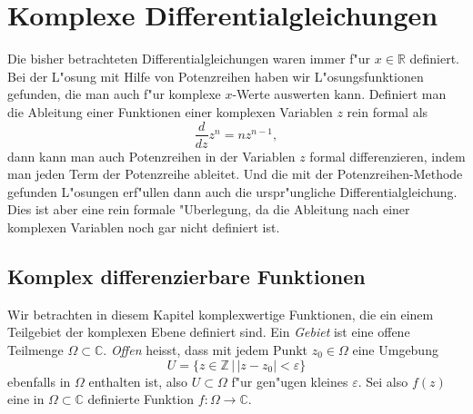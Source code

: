 %
%
%
\chapter{Komplexe Differentialgleichungen\label{chapter:komplexeanalysis}}
\lhead{}
Die bisher betrachteten Differentialgleichungen waren immer f"ur
$x\in\mathbb R$ definiert.
Bei der L"osung mit Hilfe von Potenzreihen haben wir L"osungsfunktionen
gefunden, die man auch f"ur komplexe $x$-Werte auswerten kann.
Definiert man die Ableitung einer Funktionen einer komplexen Variablen
$z$ rein formal als
\[
\frac{d}{dz}z^n= nz^{n-1},
\]
dann kann man auch Potenzreihen in der Variablen $z$ formal differenzieren,
indem man jeden Term der Potenzreihe ableitet.
Und die mit der Potenzreihen-Methode gefunden L"osungen erf"ullen dann
auch die urspr"ungliche Differentialgleichung.
Dies ist aber eine rein formale "Uberlegung, da die Ableitung nach einer
komplexen Variablen noch gar nicht definiert ist.

%
%
\section{Komplex differenzierbare Funktionen}
Wir betrachten in diesem Kapitel komplexwertige Funktionen,
die ein einem Teilgebiet der komplexen Ebene definiert sind.
Ein {\em Gebiet} ist eine offene Teilmenge $\Omega\subset \mathbb C$.
{\em Offen} heisst, dass mit jedem Punkt $z_0\in\Omega$ eine Umgebung
\[
U=\{z\in\mathbb Z\,|\,|z-z_0|<\varepsilon\}
\]
ebenfalls in $\Omega$ enthalten ist, also $U\subset \Omega$ f"ur gen"ugen
kleines $\varepsilon$.
Sei also $f(z)$ eine in $\Omega\subset\mathbb C$ definierte
Funktion $f\colon\Omega\to\mathbb C$. 

